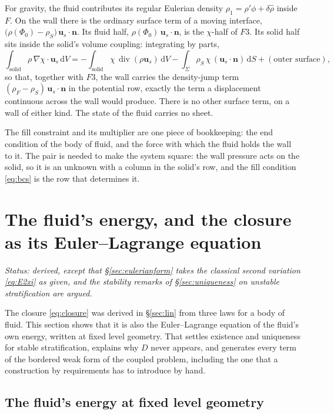\documentclass[11pt]{article}
\theoremstyle{definition}
\theoremstyle{remark}
\newcommand{\bu}{\mathbf{u}}
\newcommand{\bn}{\mathbf{n}}
\newcommand{\dS}{\,\mathrm{d}S}
\newcommand{\dV}{\,\mathrm{d}V}
\newcommand{\Div}{\operatorname{div}}
\newcommand{\status}[1]{\noindent\emph{Status: #1}\par\smallskip}
\begin{document}
For gravity, the fluid contributes its regular Eulerian density
$\rho_1 = \rho'\phi + \delta\hat\rho$ inside $F$. On the wall there is
the ordinary surface term of a moving interface,
$\bigl(\rho(\Phi_0) - \rho_S\bigr)\,\bu_s\cdot\bn$. Its fluid half,
$\rho(\Phi_0)\,\bu_s\cdot\bn$, is the $\chi$-half of $F3$. Its solid
half sits inside the solid's volume coupling: integrating by parts,
\begin{equation*}
  \int_{\text{solid}}\rho\,\nabla\chi\cdot\bu_s\dV
  = -\int_{\text{solid}}\chi\,\Div(\rho\bu_s)\dV
    - \int_\Sigma\rho_S\,\chi\,(\bu_s\cdot\bn)\dS
    + (\text{outer surface}) ,
\end{equation*}
so that, together with $F3$, the wall carries the density-jump term
$(\rho_F - \rho_S)\,\bu_s\cdot\bn$ in the potential row, exactly the
term a displacement continuous across the wall would produce. There is
no other surface term, on a wall of either kind. The state of the
fluid carries no sheet.

The fill constraint and its multiplier are one piece of bookkeeping:
the end condition of the body of fluid, and the force with which the
fluid holds the wall to it. The pair is needed to make the system
square: the wall pressure acts on the solid, so it is an unknown with a
column in the solid's row, and the fill condition \eqref{eq:bcs} is the
row that determines it.

\section{The fluid's energy, and the closure as its Euler--Lagrange equation}
\label{sec:var}

\status{derived, except that \S\ref{sec:eulerianform} takes the classical
second variation \eqref{eq:E2xi} as given, and the stability remarks of
\S\ref{sec:uniqueness} on unstable stratification are argued.}

The closure \eqref{eq:closure} was derived in \S\ref{sec:lin} from three
laws for a body of fluid. This section shows that it is also the
Euler--Lagrange equation of the fluid's own energy, written at fixed
level geometry. That settles existence and uniqueness for stable
stratification, explains why $D$ never appears, and generates every
term of the bordered weak form of the coupled problem, including the
one that a construction by requirements has to introduce by hand.

\subsection{The fluid's energy at fixed level geometry}
\label{sec:energy1d}
\end{document}

